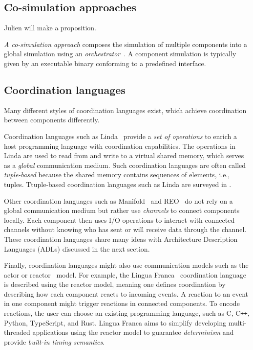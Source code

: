 \documentclass[runningheads]{llncs}
\begin{document}
\subsection{Co-simulation approaches} \label{subsec: cosim}

Julien will make a proposition.

\textit{A co-simulation approach} composes the simulation of multiple components into a global simulation using an \textit{orchestrator}~\cite{gomesCoSimulationSurvey2019}.
A component simulation is typically given by an executable binary conforming to a predefined interface.

\subsection{Coordination languages} \label{subsec: coordlang}
Many different styles of coordination languages exist, which achieve coordination between components differently.

Coordination languages such as Linda~\cite{carrieroLindaContext1989} provide a \textit{set of operations} to enrich a host programming language with coordination capabilities.
The operations in Linda are used to read from and write to a virtual shared memory, which serves as a \textit{global} communication medium.
Such coordination languages are often called \textit{tuple-based} because the shared memory contains sequences of elements, i.e., tuples.
Ttuple-based coordination languages such as Linda are surveyed in \cite{rossiTuplebasedTechnologiesCoordination2001,nixonTuplespacebasedComputingSemantic2008,omiciniCoordinationModelsLanguages2011}.

Other coordination languages such as Manifold~\cite{arbabOverviewManifoldIts1993,papadopoulosModellingActivitiesInformation1998} and REO~\cite{arbabReoChannelbasedCoordination2004} do not rely on a global communication medium but rather use \textit{channels} to connect components locally.
Each component then uses I/O operations to interact with connected channels without knowing who has sent or will receive data through the channel.
These coordination languages share many ideas with Architecture Description Languages (ADLs) discussed in the next section.

Finally, coordination languages might also use communication models such as the actor or reactor~\cite{lohstrohReactorsDeterministicModel2020} model.
For example, the Lingua Franca~\cite{lohstrohReactorsDeterministicModel2020,lohstrohLinguaFrancaDeterministic2021} coordination language is described using the reactor model, meaning one defines coordination by describing how each component reacts to incoming events.
A reaction to an event in one component might trigger reactions in connected components.
To encode reactions, the user can choose an existing programming language, such as C, C\texttt{++}, Python, TypeScript, and Rust.
Lingua Franca aims to simplify developing multi-threaded applications using the reactor model to guarantee \textit{determinism} and provide \textit{built-in timing semantics}.
\end{document}
